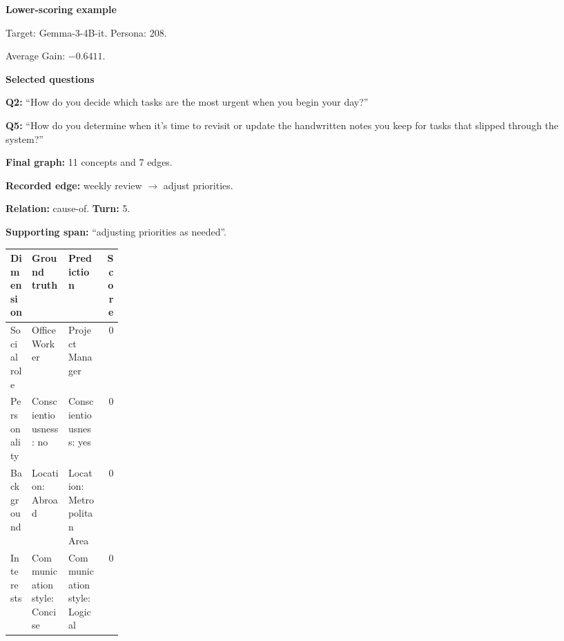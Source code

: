 \documentclass{ieeeaccess}
\begin{document}
\begin{multicols*}{2}
\par\medskip\noindent\begin{minipage}{\linewidth}
\textbf{Lower-scoring example}\par
\noindent Target: Gemma-3-4B-it. Persona: 208.\par
\noindent Average Gain: $-0.6411$.\par\smallskip
\noindent\textbf{Selected questions}\par
\noindent\textbf{Q2:} ``How do you decide which tasks are the most urgent when you begin your day?''\par
\noindent\textbf{Q5:} ``How do you determine when it's time to revisit or update the handwritten notes you keep for tasks that slipped through the system?''\par\smallskip
\noindent\textbf{Final graph:} 11 concepts and 7 edges.\par
\noindent\textbf{Recorded edge:} weekly review $\rightarrow$ adjust priorities.\par
\noindent\textbf{Relation:} cause-of. \textbf{Turn:} 5.\par
\noindent\textbf{Supporting span:} ``adjusting priorities as needed''.\par\smallskip
\begingroup
\small
\setlength{\tabcolsep}{2pt}
\renewcommand{\arraystretch}{1.12}
\noindent\begin{tabularx}{\linewidth}{@{}p{0.19\linewidth}>{\raggedright\arraybackslash}X>{\raggedright\arraybackslash}Xr@{}}
\toprule
Dimension & Ground truth & Prediction & Score \\
\midrule
Social role & Office Worker & Project Manager & 0 \\
\addlinespace[2pt]
Personality & Conscientiousness: no & Conscientiousness: yes & 0 \\
\addlinespace[2pt]
Background & Location: Abroad & Location: Metropolitan Area & 0 \\
\addlinespace[2pt]
Interests & Communication style: Concise & Communication style: Logical & 0 \\
\bottomrule
\end{tabularx}\par
\endgroup
\end{minipage}\par\medskip

\smallskip


\end{multicols*}
\end{document}
